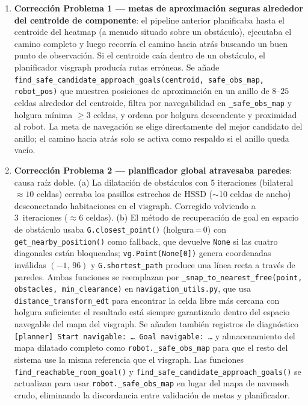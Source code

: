 \begin{enumerate}
  \item \textbf{Corrección Problema 1 — metas de aproximación seguras alrededor del
        centroide de componente}: el pipeline anterior planificaba hasta el centroide
        del heatmap (a menudo situado sobre un obstáculo), ejecutaba el camino completo
        y luego recorría el camino hacia atrás buscando un buen punto de observación. Si
        el centroide caía dentro de un obstáculo, el planificador visgraph producía rutas
        erróneas. Se añade \texttt{find\_safe\_candidate\_approach\_goals(centroid,
        safe\_obs\_map, robot\_pos)} que muestrea posiciones de aproximación en un anillo
        de $8$--$25$ celdas alrededor del centroide, filtra por navegabilidad en
        \texttt{\_safe\_obs\_map} y holgura mínima $\ge 3$ celdas, y ordena por holgura
        descendente y proximidad al robot. La meta de navegación se elige directamente
        del mejor candidato del anillo; el camino hacia atrás solo se activa como
        respaldo si el anillo queda vacío.

  \item \textbf{Corrección Problema 2 — planificador global atravesaba paredes}:
        causa raíz doble. (a) La dilatación de obstáculos con 5 iteraciones (bilateral
        $\approx10$ celdas) cerraba los pasillos estrechos de HSSD ($\sim$10 celdas de
        ancho) desconectando habitaciones en el visgraph. Corregido volviendo a
        3~iteraciones ($\approx6$ celdas). (b) El método de recuperación de goal en
        espacio de obstáculo usaba \texttt{G.closest\_point()} (holgura\,=\,0) con
        \texttt{get\_nearby\_position()} como fallback, que devuelve \texttt{None} si
        las cuatro diagonales están bloqueadas; \texttt{vg.Point(None[0])} genera
        coordenadas inválidas $(-1,\,96)$ y \texttt{G.shortest\_path} produce una línea
        recta a través de paredes. Ambas funciones se reemplazan por
        \texttt{\_snap\_to\_nearest\_free(point, obstacles, min\_clearance)} en
        \texttt{navigation\_utils.py}, que usa \texttt{distance\_transform\_edt} para
        encontrar la celda libre más cercana con holgura suficiente: el resultado está
        siempre garantizado dentro del espacio navegable del mapa del visgraph.
        Se añaden también registros de diagnóstico \texttt{[planner] Start navigable:
        \ldots{} Goal navigable: \ldots{}} y almacenamiento del mapa dilatado completo
        como \texttt{robot.\_safe\_obs\_map} para que el resto del sistema use la misma
        referencia que el visgraph. Las funciones
        \texttt{find\_reachable\_room\_goal()} y
        \texttt{find\_safe\_candidate\_approach\_goals()} se actualizan para usar
        \texttt{robot.\_safe\_obs\_map} en lugar del mapa de navmesh crudo, eliminando
        la discordancia entre validación de metas y planificador.


\end{enumerate}
